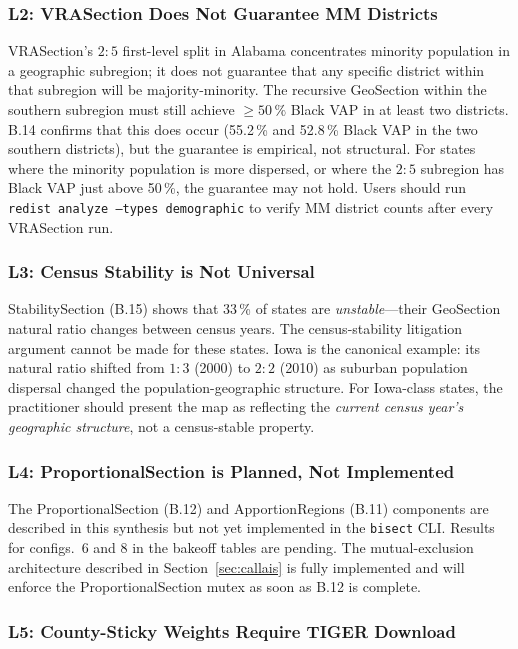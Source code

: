 \subsubsection*{L2: VRASection Does Not Guarantee MM Districts}

VRASection's $2:5$ first-level split in Alabama concentrates minority population
in a geographic subregion; it does not guarantee that any specific district
within that subregion will be majority-minority.
The recursive GeoSection within the southern subregion must still achieve $\geq 50\,\%$
Black VAP in at least two districts.
B.14 confirms that this does occur (55.2\,\% and 52.8\,\% Black VAP in the two
southern districts), but the guarantee is empirical, not structural.
For states where the minority population is more dispersed, or where the $2:5$
subregion has Black VAP just above 50\,\%, the guarantee may not hold.
Users should run \texttt{redist analyze --types demographic} to verify MM
district counts after every VRASection run.

\subsubsection*{L3: Census Stability is Not Universal}

StabilitySection (B.15) shows that 33\,\% of states are \emph{unstable}---their
GeoSection natural ratio changes between census years.
The census-stability litigation argument cannot be made for these states.
Iowa is the canonical example: its natural ratio shifted from $1:3$ (2000) to
$2:2$ (2010) as suburban population dispersal changed the population-geographic
structure.
For Iowa-class states, the practitioner should present the map as reflecting
the \emph{current census year's geographic structure}, not a census-stable
property.

\subsubsection*{L4: ProportionalSection is Planned, Not Implemented}

The ProportionalSection (B.12) and ApportionRegions (B.11) components are
described in this synthesis but not yet implemented in the \texttt{bisect} CLI.
Results for configs.~6 and 8 in the bakeoff tables are pending.
The mutual-exclusion architecture described in Section~\ref{sec:callais} is
fully implemented and will enforce the ProportionalSection mutex as soon as
B.12 is complete.

\subsubsection*{L5: County-Sticky Weights Require TIGER Download}

